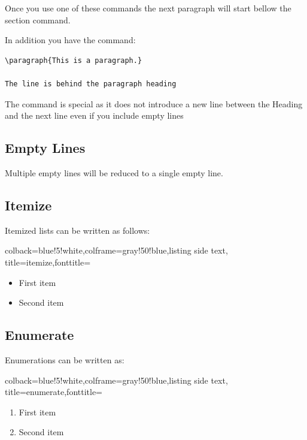 Once you use one of these commands the next paragraph will start bellow
the section command.

In addition you have the command:

\begin{verbatim}
\paragraph{This is a paragraph.}

The line is behind the paragraph heading
\end{verbatim}

The command is special as it does not introduce a new line between the
Heading and the next line even if you include empty lines

\subsection{Empty Lines}\label{empty-lines}

Multiple empty lines will be reduced to a single empty line.

\subsection{Itemize}\label{itemize}


Itemized lists can be written as follows:


\begin{tcblisting}{colback=blue!5!white,colframe=gray!50!blue,listing side text,
  title=itemize,fonttitle=\bfseries}
\begin{itemize}
   \item First item
   \item Second item
\end{itemize}
\end{tcblisting} 


\subsection{Enumerate}\label{enumerate}

Enumerations can be written as:

\begin{tcblisting}{colback=blue!5!white,colframe=gray!50!blue,listing side text,
  title=enumerate,fonttitle=\bfseries}
\begin{enumerate}
   \item First item
   \item Second item
\end{enumerate}
\end{tcblisting} 

